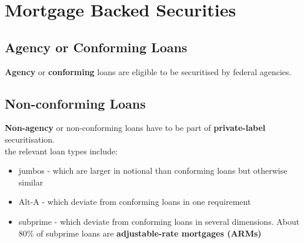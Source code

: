 \chapter{Mortgage Backed Securities}


\section{Agency or Conforming Loans}
\textbf{Agency} or \textbf{conforming} loans are eligible to be securitised by federal agencies.

\section{Non-conforming Loans}
\textbf{Non-agency} or {non-conforming} loans have to be part of \textbf{private-label} securitisation.\\
the relevant loan types include:
\begin{itemize}
	\item jumbos - which are larger in notional than conforming loans but otherwise similar
	\item Alt-A - which deviate from conforming loans in one requirement
	\item subprime - which deviate from conforming loans in several dimensions. About 80\% of subprime loans are \textbf{adjustable-rate mortgages (ARMs)}
\end{itemize}

